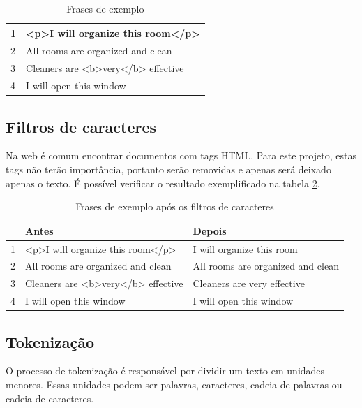 \begin{table}[htb]
	\centering
    \def\arraystretch{1.2} %
    \begin{tabular}{|l|l|}
        \hline
        1 & <p>I will organize this room</p>            \\ \hline
        2 & All rooms are organized and clean \\ \hline
        3 & Cleaners are <b>very</b> effective                              \\ \hline
        4 & I will open this window                            \\ \hline
    \end{tabular}
	\caption{Frases de exemplo}
    \label{tab:example}
\end{table}


\subsection{Filtros de caracteres}
Na web é comum encontrar documentos com tags HTML. Para este projeto, estas tags não terão importância, portanto serão removidas e apenas será deixado apenas o texto. É possível verificar o resultado exemplificado na tabela \ref{tab:charfilter}.

\begin{table}[htb]
	\centering
    \def\arraystretch{1.2} %
    \begin{tabular}{|l|l|l|}
        \hline
        & \textbf{Antes} & \textbf{Depois} \\ \hline
        1 & <p>I will organize this room</p> & I will organize this room            \\ \hline
        2 & All rooms are organized and clean & All rooms are organized and clean \\ \hline
        3 & Cleaners are <b>very</b> effective & Cleaners are very effective                              \\ \hline
        4 & I will open this window & I will open this window                             \\ \hline
    \end{tabular}
	\caption{Frases de exemplo após os filtros de caracteres}
    \label{tab:charfilter}
\end{table}

\subsection{Tokenização}
O processo de tokenização é responsável por dividir um texto em unidades menores. Essas unidades podem ser palavras, caracteres, cadeia de palavras ou cadeia de caracteres. 

